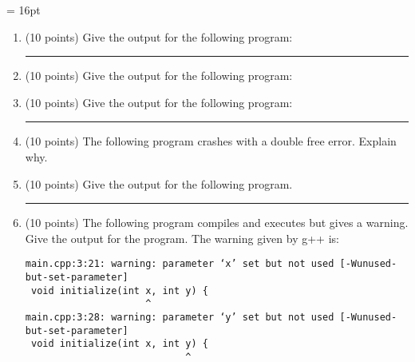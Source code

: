 \documentclass[times, 11pt]{article}
\def\figline{\rule{\textwidth}{0.3mm}}
\begin{document}

\date{}





\baselineskip = 16pt

\begin{enumerate}


\item
(10 points)
Give the output for the following program:
{\footnotesize

}

\vspace{0.5in}
\figline


\item
(10 points)
Give the output for the following program:
{\footnotesize

}

\newpage

\item
(10 points)
Give the output for the following program:
{\footnotesize

}

\vspace{0.5in}
\figline

\item
(10 points)
The following program crashes with a double free error. Explain why.

{\footnotesize

}

\newpage

\item
(10 points)
Give the output for the following program.

{\footnotesize

}

\vspace{0.5in}
\figline

\item
(10 points)
The following program compiles and executes but gives a warning.
Give the output for the program. The warning given by {\sf g++} is:

{\footnotesize
\begin{verbatim}
main.cpp:3:21: warning: parameter ‘x’ set but not used [-Wunused-but-set-parameter]
 void initialize(int x, int y) {
                     ^
main.cpp:3:28: warning: parameter ‘y’ set but not used [-Wunused-but-set-parameter]
 void initialize(int x, int y) {
                            ^
\end{verbatim}
}


\end{enumerate}
\end{document}
